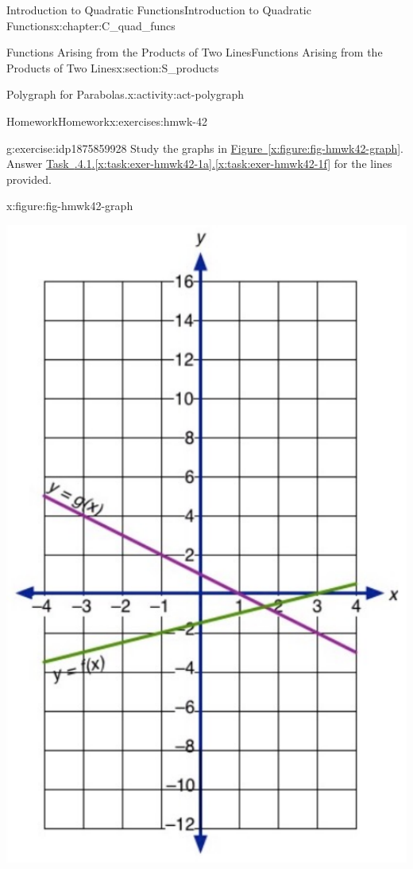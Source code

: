 \documentclass[oneside,10pt,]{book}
\newcommand{\xreffont}{\relax}
\numberwithin{equation}{chapter}
\begin{document}
\begin{chapterptx}{Introduction to Quadratic Functions}{}{Introduction to Quadratic Functions}{}{}{x:chapter:C_quad_funcs}
\begin{sectionptx}{Functions Arising from the Products of Two Lines}{}{Functions Arising from the Products of Two Lines}{}{}{x:section:S_products}
\begin{activity}{Polygraph for Parabolas.}{x:activity:act-polygraph}
\end{activity}%
%
%
\typeout{************************************************}
\typeout{************************************************}
%
\begin{exercises-subsection}{Homework}{}{Homework}{}{}{x:exercises:hmwk-42}
\begin{divisionexercise}{1}{}{}{g:exercise:idp1875859928}%
Study the graphs in \hyperref[x:figure:fig-hmwk42-graph]{Figure~{\xreffont\ref{x:figure:fig-hmwk42-graph}}}. Answer \hyperref[x:task:exer-hmwk42-1a]{Task~{\xreffont 4.2.4.1}.{\xreffont\ref{x:task:exer-hmwk42-1a}}\textendash{}{\xreffont 4.2.4.1}.{\xreffont\ref{x:task:exer-hmwk42-1f}}} for the lines provided.%
\begin{figureptx}{}{x:figure:fig-hmwk42-graph}{}%
\begin{image}{0.25}{0.5}{0.25}%
\includegraphics[width=\linewidth]{external/hmwk42-1.pdf}

\end{image}
\end{figureptx}
\end{divisionexercise}
\end{exercises-subsection}
\end{sectionptx}
\end{chapterptx}
\end{document}
